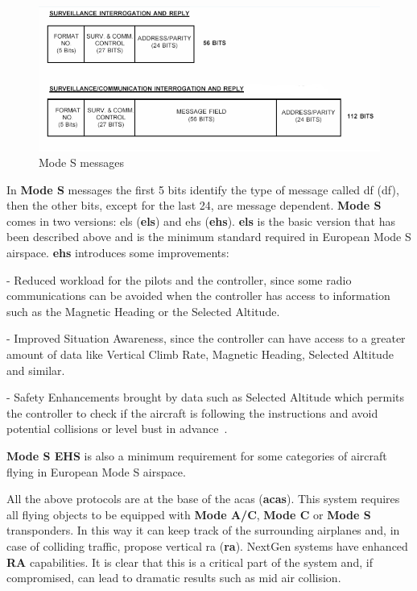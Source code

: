 \documentclass[../main.tex]{subfiles}
\begin{document}
\begin{figure}[htp]
  \centering
  \includegraphics[scale=0.65]{images/modes.png}
  \caption{Mode S messages}
  \label{fig:modes}
\end{figure}

In \textbf{Mode S} messages the first 5 bits identify the type of message called \acrlong{df} (\acrshort{df}), then the other bits, except for the last 24, are message dependent. \textbf{Mode S} comes in two versions: \acrlong{els} (\textbf{\acrshort{els}}) and \acrlong{ehs} (\textbf{\acrshort{ehs}}). \textbf{\acrshort{els}} is the basic version that has been described above and is the minimum standard required in European Mode S airspace. \textbf{\acrshort{ehs}} introduces some improvements:

- Reduced workload for the pilots and the controller, since some radio communications can be avoided when the controller has access to information such as the Magnetic Heading or the Selected Altitude.

- Improved Situation Awareness, since the controller can have access to a greater amount of data like Vertical Climb Rate, Magnetic Heading, Selected Altitude and similar.

- Safety Enhancements brought by data such as Selected Altitude which permits the controller to check if the aircraft is following the instructions and avoid potential collisions or level bust in advance~\cite{modesbook}.

\textbf{Mode S EHS} is also a minimum requirement for some categories of aircraft flying in European Mode S airspace.

All the above protocols are at the base of the \acrlong{acas} (\textbf{\acrshort{acas}}). This system requires all flying objects to be equipped with \textbf{Mode A/C}, \textbf{Mode C} or \textbf{Mode S} transponders. In this way it can keep track of the surrounding airplanes and, in case of colliding traffic, propose vertical \acrlong{ra} (\textbf{\acrshort{ra}}). NextGen systems have enhanced \textbf{RA} capabilities. It is clear that this is a critical part of the system and, if compromised, can lead to dramatic results such as mid air collision.
\end{document}
